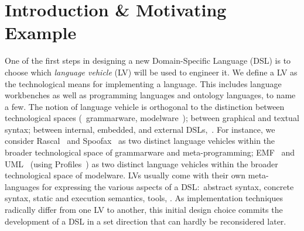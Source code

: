 \section{Introduction \& Motivating Example}
One of the first steps in designing a new Domain-Specific Language (DSL) is to choose which \emph{language vehicle} (LV) will be used to engineer it.
We define a LV as the technological means for implementing a language.
This includes language workbenches as well as programming languages and ontology languages, to name a few.
The notion of language vehicle is orthogonal to the distinction between technological spaces (\eg~grammarware, modelware~\cite{kurtev2002technological}); between graphical and textual syntax; between internal, embedded, and external DSLs,~\etc.
For instance, we consider Rascal~\cite{klint2010easy} and Spoofax~\cite{kats2010spoofax} as two distinct language vehicles within the broader technological space of grammarware and meta-programming; EMF~\cite{steinberg2008emf} and UML~\cite{fowler2004uml} (using Profiles~\cite{selic2007systematic}) as two distinct language vehicles within the broader technological space of modelware.
LVs usually come with their own meta-languages for expressing the various aspects of a DSL:~abstract syntax, concrete syntax, static and execution semantics, tools, \etc.
As implementation techniques radically differ from one LV to another, this initial design choice commits the development of a DSL in a set direction that can hardly be reconsidered later.

